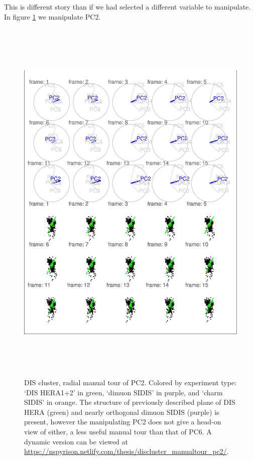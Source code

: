 \documentclass{monashthesis}
\begin{document}
This is different story than if we had selected a different variable to
manipulate. In figure \ref{fig:DISclusterBad} we manipulate PC2.










\begin{figure}

{\centering \includegraphics[width=6in,height=7.2in]{thesis_files/figure-latex/DISclusterBad-1} 

}

\caption{DIS cluster, radial manual tour of PC2. Colored
by experiment type: `DIS HERA1+2' in green, `dimuon SIDIS' in purple,
and `charm SIDIS' in orange. The structure of previously described plane
of DIS HERA (green) and nearly orthogonal dimuon SIDIS (purple) is
present, however the manipulating PC2 does not give a head-on view of
either, a less useful manual tour than that of PC6. A dynamic version
can be viewed at
\url{https://nspyrison.netlify.com/thesis/discluster_manualtour_pc2/}.}\label{fig:DISclusterBad}
\end{figure}
\end{document}
